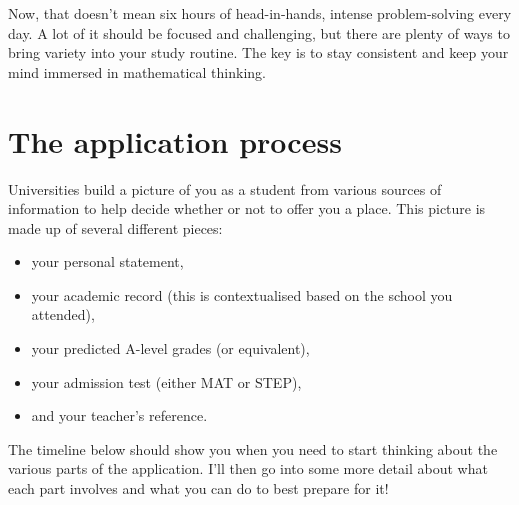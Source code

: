 \documentclass[11pt]{article}
\newif\ifshowcomments
\newif\ifshowpersonal
\newcommand{\comment}[1]{\ifshowcomments\textcolor{myblue}{\textbf{#1}}\fi}
\newcommand{\personal}[1]{\ifshowpersonal\textcolor{myorange}{\emph{#1}}\fi}
\begin{document}
Now, that doesn’t mean six hours of head-in-hands, intense problem-solving every day. A lot of it should be focused and challenging, but there are plenty of ways to bring variety into your study routine. The key is to stay consistent and keep your mind immersed in mathematical thinking.



\comment{Aarna, you are doing plenty of work! Don't worry about doing any more!!}

\section{The application process}

Universities build a picture of you as a student from various sources of information to help decide whether or not to offer you a place. This picture is made up of several different pieces:
\begin{itemize}
\item your personal statement,
\item your academic record (this is contextualised based on the school you attended),
\item your predicted A-level grades (or equivalent),
\item your admission test (either MAT or STEP),
\item and your teacher's reference.
\end{itemize}
 

The timeline below should show you when you need to start thinking about the various parts of the application. I'll then go into some more detail about what each part involves and what you can do to best prepare for it!
\end{document}
